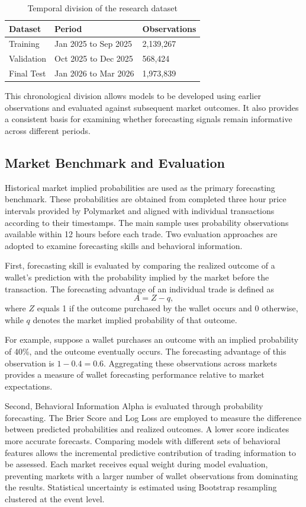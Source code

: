 \begin{table}[htbp]
\centering
\caption{Temporal division of the research dataset}\label{tab:splits}
\begin{tabular}{lll}
\toprule
Dataset & Period & Observations \\
\midrule
Training & Jan 2025 to Sep 2025 & 2,139,267 \\
Validation & Oct 2025 to Dec 2025 & 568,424 \\
Final Test & Jan 2026 to Mar 2026 & 1,973,839 \\
\bottomrule
\end{tabular}
\end{table}

This chronological division allows models to be developed using earlier observations and evaluated against subsequent market outcomes. It also provides a consistent basis for examining whether forecasting signals remain informative across different periods.

\subsection{Market Benchmark and Evaluation}\label{sec:eval}

Historical market implied probabilities are used as the primary forecasting benchmark. These probabilities are obtained from completed three hour price intervals provided by Polymarket and aligned with individual transactions according to their timestamps. The main sample uses probability observations available within 12 hours before each trade. Two evaluation approaches are adopted to examine forecasting skills and behavioral information.

First, forecasting skill is evaluated by comparing the realized outcome of a wallet's prediction with the probability implied by the market before the transaction. The forecasting advantage of an individual trade is defined as
\begin{equation}\label{eq:advantage}
A = Z-q,
\end{equation}
where $Z$ equals 1 if the outcome purchased by the wallet occurs and 0 otherwise, while $q$ denotes the market implied probability of that outcome.

For example, suppose a wallet purchases an outcome with an implied probability of 40\%, and the outcome eventually occurs. The forecasting advantage of this observation is $1-0.4=0.6$. Aggregating these observations across markets provides a measure of wallet forecasting performance relative to market expectations.

Second, Behavioral Information Alpha is evaluated through probability forecasting. The Brier Score and Log Loss are employed to measure the difference between predicted probabilities and realized outcomes. A lower score indicates more accurate forecasts. Comparing models with different sets of behavioral features allows the incremental predictive contribution of trading information to be assessed. Each market receives equal weight during model evaluation, preventing markets with a larger number of wallet observations from dominating the results. Statistical uncertainty is estimated using Bootstrap resampling clustered at the event level.
